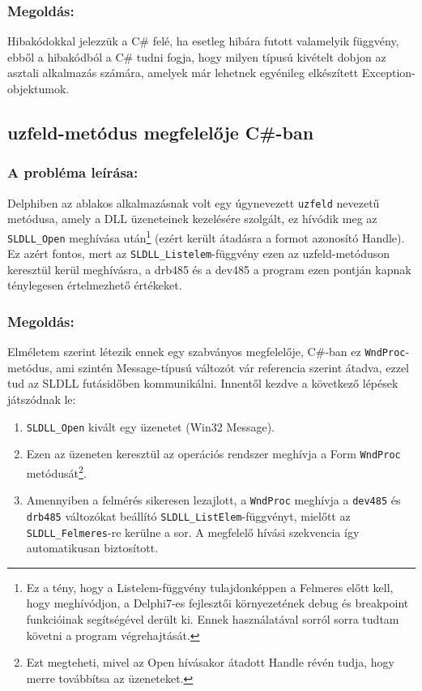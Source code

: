 \documentclass[tocnopagenum]{thesis-ekf}
\theoremstyle{definition}
\theoremstyle{remark}
\begin{document}
	\subsubsection{Megoldás:} Hibakódokkal jelezzük a C\# felé, ha esetleg hibára futott valamelyik függvény, ebből a hibakódból a C\# tudni fogja, hogy milyen típusú kivételt dobjon az asztali alkalmazás számára, amelyek már lehetnek egyénileg elkészített Exception-objektumok.
	\subsection{uzfeld-metódus megfelelője C\#-ban}
	\subsubsection{A probléma leírása:} Delphiben az ablakos alkalmazásnak volt egy úgynevezett \verb*|uzfeld| nevezetű metódusa, amely a DLL üzeneteinek kezelésére szolgált, ez hívódik meg az \verb*|SLDLL_Open| meghívása után\footnote{Ez a tény, hogy a Listelem-függvény tulajdonképpen a Felmeres előtt kell, hogy meghívódjon, a Delphi7-es fejlesztői környezetének debug és breakpoint funkcióinak segítségével derült ki. Ennek használatával sorról sorra tudtam követni a program végrehajtását.} (ezért került átadásra a formot azonosító Handle). Ez azért fontos, mert az \verb*|SLDLL_Listelem|-függvény ezen az uzfeld-metóduson keresztül kerül meghívásra, a drb485 és a dev485 a program ezen pontján kapnak ténylegesen értelmezhető értékeket.
	\subsubsection{Megoldás:}
	\label{wndproc}
	Elméletem szerint létezik ennek egy szabványos megfelelője, C\#-ban ez \verb*|WndProc|-metódus, ami szintén Message-típusú változót vár referencia szerint átadva, ezzel tud az SLDLL futásidőben kommunikálni.
	Innentől kezdve a következő lépések játszódnak le:
	\begin{enumerate}
		\item \verb*|SLDLL_Open| kivált egy üzenetet (Win32 Message).
		\item Ezen az üzeneten keresztül az operációs rendszer meghívja a Form \verb*|WndProc| metódusát\footnote{Ezt megteheti, mivel az Open hívásakor átadott Handle révén tudja, hogy merre továbbítsa az üzeneteket.}.
		\item Amennyiben a felmérés sikeresen lezajlott, a \verb*|WndProc| meghívja a \verb*|dev485| és \verb*|drb485| változókat beállító \verb*|SLDLL_ListElem|-függvényt, mielőtt az \verb*|SLDLL_Felmeres|-re kerülne a sor. A megfelelő hívási szekvencia így automatikusan biztosított.
	\end{enumerate}
\end{document}
